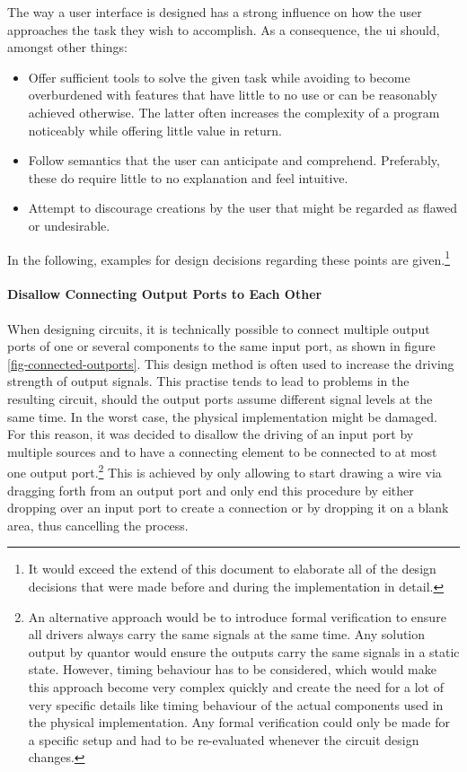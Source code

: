 	The way a user interface is designed has a strong influence on how the user approaches the task they wish to accomplish.
	As a consequence, the \gls{ui} should, amongst other things: 

	\begin{itemize}
		\item Offer sufficient tools to solve the given task while avoiding to become overburdened with features that have little to no use or can be reasonably achieved otherwise.
			The latter often increases the complexity of a program noticeably while offering little value in return. 
		\item Follow semantics that the user can anticipate and comprehend. 
			Preferably, these do require little to no explanation and feel intuitive.
		\item Attempt to discourage creations by the user that might be regarded as flawed or undesirable.
	\end{itemize}		
	In the following, examples for design decisions regarding these points are given.\footnote{
		It would exceed the extend of this document to elaborate all of the design decisions that were made before and during the implementation in detail.
	}
	 
	\paragraph{Disallow Connecting Output Ports to Each Other}
		When designing circuits, it is technically possible to connect multiple output ports of one or several components to the same input port, as shown in figure \ref{fig-connected-outports}. 
		This design method is often used to increase the driving strength of output signals.	
		This practise tends to lead to problems in the resulting circuit, should the output ports assume different signal levels at the same time. 
		In the worst case, the physical implementation might be damaged.
		For this reason, it was decided to disallow the driving of an input port by multiple sources and to have a connecting element to be connected to at most one output port.\footnote{
			An alternative approach would be to introduce formal verification to ensure all drivers always carry the same signals at the same time.
			Any solution output by \gls{quantor} would ensure the outputs carry the same signals in a static state.
			However, timing behaviour has to be considered, which would make this approach become very complex quickly and create the need for a lot of very specific details like timing behaviour of the actual components used in the physical implementation.
			Any formal verification could only be made for a specific setup and had to be re-evaluated whenever the circuit design changes.
		} 
		This is achieved by only allowing to start drawing a wire via dragging forth from an output port and only end this procedure by either dropping over an input port to create a connection or by dropping it on a blank area, thus cancelling the process.
	
